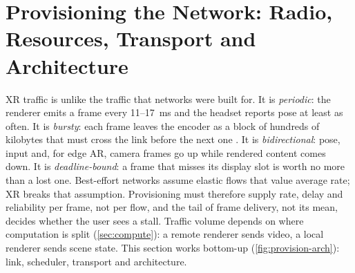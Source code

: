 \section{Provisioning the Network: Radio, Resources, Transport and Architecture}\label{sec:provision}

XR traffic is unlike the traffic that networks were built for. It is \emph{periodic}: the renderer emits
a frame every 11--17~ms and the headset reports pose at least as often. It is \emph{bursty}: each frame
leaves the encoder as a block of hundreds of kilobytes that must cross the link before the next one
\cite{W2838572662}. It is \emph{bidirectional}: pose, input and, for edge AR, camera frames go up while
rendered content comes down. It is \emph{deadline-bound}: a frame that misses its display slot is worth
no more than a lost one. Best-effort networks assume elastic flows that value average rate; XR breaks
that assumption. Provisioning must therefore supply rate, delay and reliability per frame, not per flow,
and the tail of frame delivery, not its mean, decides whether the user sees a stall. Traffic volume
depends on where computation is split (\cref{sec:compute}): a remote renderer sends video, a local
renderer sends scene state. This section works bottom-up (\cref{fig:provision-arch}): link, scheduler,
transport and architecture.

